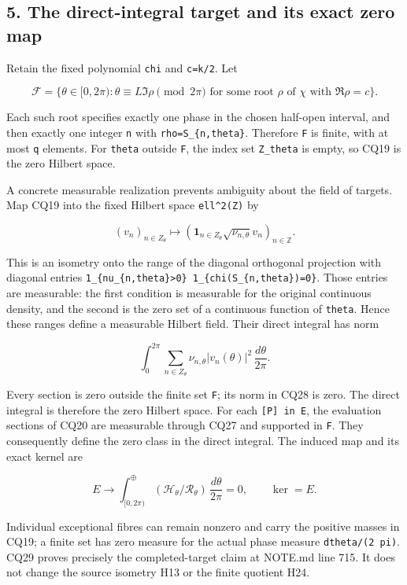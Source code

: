 \subsection{5. The direct-integral target and its exact zero map}\label{the-direct-integral-target-and-its-exact-zero-map}

Retain the fixed polynomial \texttt{chi} and \texttt{c=k/2}. Let

\[
\mathcal F=
\{\theta\in[0,2\pi):
\theta\equiv L\Im\rho\pmod{2\pi}
\text{ for some root }\rho\text{ of }\chi
\text{ with }\Re\rho=c\}.
\tag{CQ26}
\]

Each such root specifies exactly one phase in the chosen half-open interval, and then exactly one integer \texttt{n} with \texttt{rho=S\_\{n,theta\}}. Therefore \texttt{F} is finite, with at most \texttt{q} elements. For \texttt{theta} outside \texttt{F}, the index set \texttt{Z\_theta} is empty, so CQ19 is the zero Hilbert space.

A concrete measurable realization prevents ambiguity about the field of targets. Map CQ19 into the fixed Hilbert space \texttt{ell\^{}2(Z)} by

\[
(v_n)_{n\in Z_\theta}\longmapsto
\left(\mathbf1_{n\in Z_\theta}\sqrt{\nu_{n,\theta}}v_n\right)_{n\in\mathbb Z}.
\tag{CQ27}
\]

This is an isometry onto the range of the diagonal orthogonal projection with diagonal entries \texttt{1\_\{nu\_\{n,theta\}\textgreater{}0\}\ 1\_\{chi(S\_\{n,theta\})=0\}}. Those entries are measurable: the first condition is measurable for the original continuous density, and the second is the zero set of a continuous function of \texttt{theta}. Hence these ranges define a measurable Hilbert field. Their direct integral has norm

\[
\int_0^{2\pi}\sum_{n\in Z_\theta}
\nu_{n,\theta}|v_n(\theta)|^2\,\frac{d\theta}{2\pi}.
\tag{CQ28}
\]

Every section is zero outside the finite set \texttt{F}; its norm in CQ28 is zero. The direct integral is therefore the zero Hilbert space. For each \texttt{{[}P{]}\ in\ E}, the evaluation sections of CQ20 are measurable through CQ27 and supported in \texttt{F}. They consequently define the zero class in the direct integral. The induced map and its exact kernel are

\[
E\longrightarrow
\int_{[0,2\pi)}^\oplus
(\mathcal H_\theta/\mathcal R_\theta)\,\frac{d\theta}{2\pi}
=0,
\qquad \ker=E.
\tag{CQ29}
\]

Individual exceptional fibres can remain nonzero and carry the positive masses in CQ19; a finite set has zero measure for the actual phase measure \texttt{dtheta/(2\ pi)}. CQ29 proves precisely the completed-target claim at NOTE.md line 715. It does not change the source isometry H13 or the finite quotient H24.


